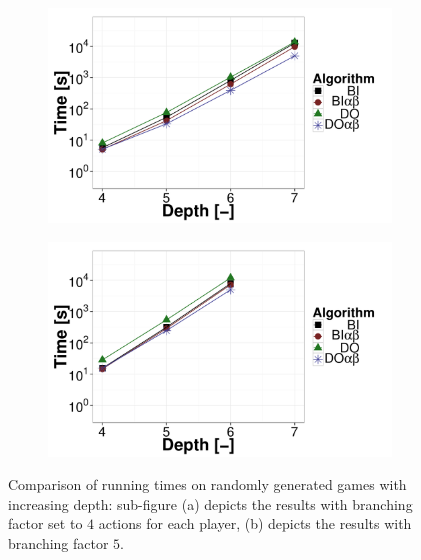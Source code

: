 \begin{figure}
\centering
	\begin{subfigure}{0.49\textwidth}
		\includegraphics[width=1\textwidth]{figures/RG-BF4-BIN-FALSE.pdf}\caption{}\label{fig:off:res:rgbf4}
	\end{subfigure}
	\begin{subfigure}{0.49\textwidth}
		\includegraphics[width=1\textwidth]{figures/RG-BF5-BIN-FALSE.pdf}\caption{}\label{fig:off:res:rgbf5}
	\end{subfigure}
\caption{Comparison of running times on randomly generated games with increasing depth: sub-figure (a) depicts the results with branching factor set to $4$ actions for each player, (b) depicts the results with branching factor $5$.} \label{fig:off:res:rg}
\end{figure}

